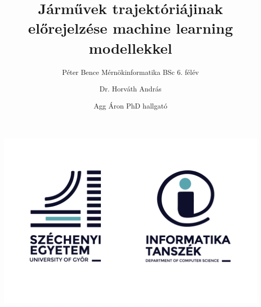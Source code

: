 \documentclass[acmtog, authorversion]{acmart}
\begin{document}
\title{Járművek trajektóriájinak előrejelzése machine learning modellekkel}

\author{Péter Bence Mérnökinformatika BSc 6. félév}%
\authornotemark[1]

\author{Dr. Horváth András}

\author{Agg Áron PhD hallgató}

\begin{teaserfigure}
\includegraphics[width=1\columnwidth]{sze_givk_logo.png}
\end{teaserfigure}
\end{document}
